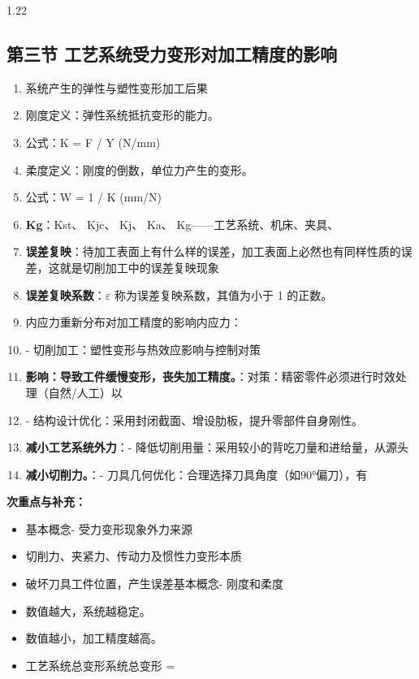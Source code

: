 \documentclass[12pt,a4paper]{article}
\begin{document}
\begin{spacing}{1.22}
\subsection{第三节 工艺系统受力变形对加工精度的影响}
\begin{tcolorbox}[colback=yellow!6,colframe=red!55!black,title=重点,left=1mm,right=1mm]
\begin{enumerate}[leftmargin=2.2em,label=\arabic*.]
  \item 系统产生的弹性与塑性变形加工后果
  \item 刚度定义：弹性系统抵抗变形的能力。
  \item 公式：K = F / Y (N/mm)
  \item 柔度定义：刚度的倒数，单位力产生的变形。
  \item 公式：W = 1 / K (mm/N)
  \item \textbf{Kg}：Kst、 Kjc、 Kj、 Ka、 Kg——工艺系统、机床、夹具、
  \item \textbf{误差复映}：待加工表面上有什么样的误差，加工表面上必然也有同样性质的误差，这就是切削加工中的误差复映现象
  \item \textbf{误差复映系数}：$\varepsilon$ 称为误差复映系数，其值为小于 1 的正数。
  \item 内应力重新分布对加工精度的影响内应力：
  \item - 切削加工：塑性变形与热效应影响与控制对策
  \item \textbf{影响：导致工件缓慢变形，丧失加工精度。}：对策：精密零件必须进行时效处理（自然/人工）以
  \item - 结构设计优化：采用封闭截面、增设肋板，提升零部件自身刚性。
  \item \textbf{减小工艺系统外力}：- 降低切削用量：采用较小的背吃刀量和进给量，从源头
  \item \textbf{减小切削力。}：- 刀具几何优化：合理选择刀具角度（如90°偏刀），有
\end{enumerate}
\end{tcolorbox}
\noindent\textbf{次重点与补充：}
\begin{itemize}[leftmargin=2.2em,label=--]
  \item 基本概念- 受力变形现象外力来源
  \item 切削力、夹紧力、传动力及惯性力变形本质
  \item 破坏刀具工件位置，产生误差基本概念- 刚度和柔度
  \item 数值越大，系统越稳定。
  \item 数值越小，加工精度越高。
  \item 工艺系统总变形系统总变形 =

\end{itemize}
\end{spacing}
\end{document}

